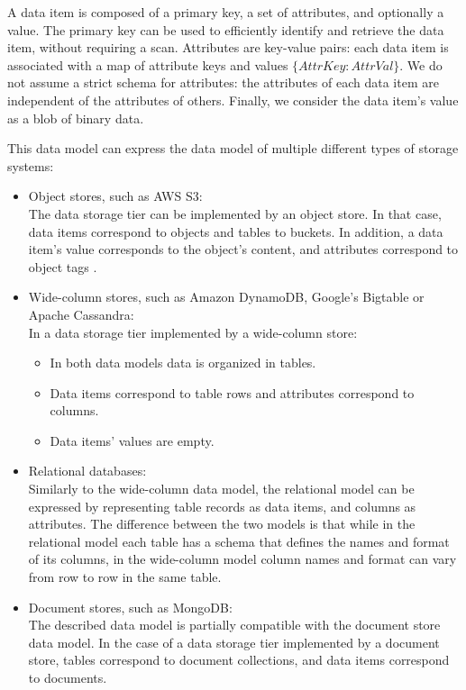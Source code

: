 A data item is composed of a primary key, a set of attributes, and optionally a value.
The primary key can be used to efficiently identify and retrieve the data item, without requiring a scan.
Attributes are key-value pairs: each data item is associated with a map of attribute keys and values
$\{AttrKey: AttrVal\}$.
We do not assume a strict schema for attributes: the attributes of each data item are independent of the attributes of
others.
Finally, we consider the data item's value as a blob of binary data.

This data model can express the data model of multiple different types of storage systems:
\begin{itemize}
  \item Object stores, such as AWS S3: \\
  The data storage tier can be implemented by an object store.
  In that case, data items correspond to objects and tables to buckets.
  In addition, a data item's value corresponds to the object's content, and attributes correspond to object
  tags \cite{awss3:tagging}.
  \item Wide-column stores, such as Amazon DynamoDB, Google's Bigtable or Apache Cassandra: \\
  In a data storage tier implemented by a wide-column store:
  \begin{itemize}
    \item In both data models data is organized in tables.
    \item Data items correspond to table rows and attributes correspond to columns.
    \item Data items' values are empty.
  \end{itemize}
  \item Relational databases: \\
  Similarly to the wide-column data model, the relational model can be expressed by representing table records as data items,
  and columns as attributes.
  The difference between the two models is that while in the relational model each table has a schema that defines the
  names and format of its columns, in the wide-column model column names and format can vary from row to row in the same
  table.
  \item Document stores, such as MongoDB: \\
  The described data model is partially compatible with the document store data model.
  In the case of a data storage tier implemented by a document store, tables correspond to document collections, and
  data items correspond to documents.

\end{itemize}
